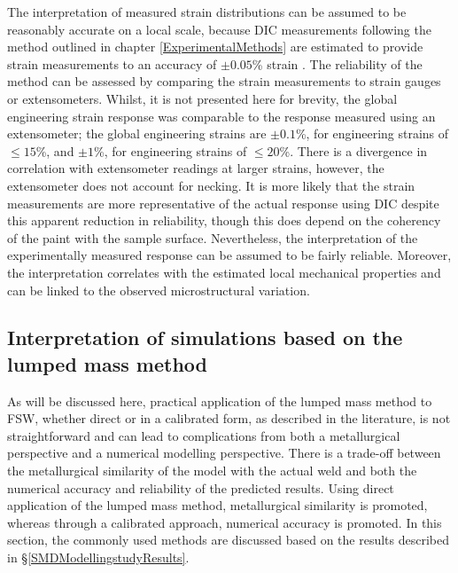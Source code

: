 The interpretation of measured strain distributions can be assumed to be reasonably accurate on a local scale, because DIC measurements following the method outlined in chapter \ref{ExperimentalMethods} are estimated to provide strain measurements to an accuracy of $\pm 0.05$\% strain \cite{DaFonseca2005}. The reliability of the method can be assessed by comparing the strain measurements to strain gauges or extensometers. Whilst, it is not presented here for brevity, the global engineering strain response was comparable to the response measured using an extensometer; the global engineering strains are $\pm 0.1$\%, for engineering strains of $\leq 15$\%, and $\pm 1$\%, for engineering strains of $\leq 20$\%. There is a divergence in correlation with extensometer readings at larger strains, however, the extensometer does not account for necking. It is more likely that the strain measurements are more representative of the actual response using DIC despite this apparent reduction in reliability, though this does depend on the coherency of the paint with the sample surface. Nevertheless, the interpretation of the experimentally measured response can be assumed to be fairly reliable. Moreover, the interpretation correlates with the estimated local mechanical properties and can be linked to the observed microstructural variation.

\subsection{Interpretation of simulations based on the lumped mass method}
\label{SMDModellingstudyDiscussionLumpedMassMethod}
As will be discussed here, practical application of the lumped mass method to FSW, whether direct or in a calibrated form, as described in the literature, is not straightforward and can lead to complications from both a metallurgical perspective and a numerical modelling perspective. There is a trade-off between the metallurgical similarity of the model with the actual weld and both the numerical accuracy and reliability of the predicted results. Using direct application of the lumped mass method, metallurgical similarity is promoted, whereas through a calibrated approach, numerical accuracy is promoted. In this section, the commonly used methods are discussed based on the results described in \S\ref{SMDModellingstudyResults}. 

